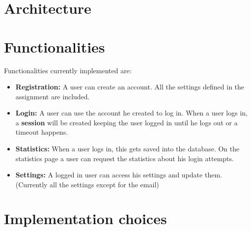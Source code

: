 \documentclass{article}
\begin{document}
\section{Architecture}
\section{Functionalities}
Functionalities currently implemented are:

\begin{itemize}
\item \textbf{Registration:} A user can create an account. All the settings defined in the assignment are included.
\item \textbf{Login:} A user can use the account he created to log in. When a user logs in, a \textbf{session} will be created keeping the user logged in until he logs out or a timeout happens.
\item \textbf{Statistics:} When a user logs in, this gets saved into the database. On the statistics page a user can request the statistics about his login attempts.
\item \textbf{Settings:} A logged in user can access his settings and update them. (Currently all the settings except for the email)
\end{itemize}

\section{Implementation choices}
\end{document}
